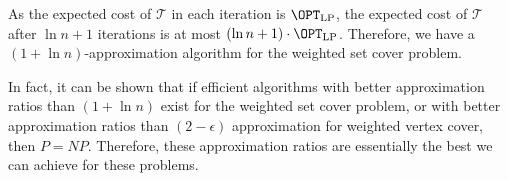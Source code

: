 As the expected cost of $\mathcal T$ in each iteration is $\OPT_\text{LP}$, the expected cost of $\mathcal T$ after $\ln n + 1$ iterations is at most $(\ln n + 1) \cdot \OPT_\text{LP}$. Therefore, we have a $(1 + \ln n)$-approximation algorithm for the weighted set cover problem.

In fact, it can be shown that if efficient algorithms with better approximation ratios than $(1 + \ln n)$ exist for the weighted set cover problem, or with better approximation ratios than $(2-\epsilon)$ approximation for weighted vertex cover, then $P = NP$. Therefore, these approximation ratios are essentially the best we can achieve for these problems.
